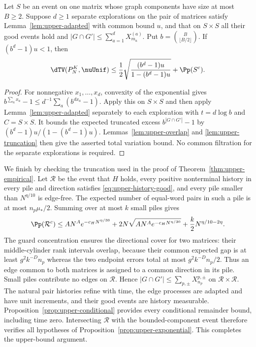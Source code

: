 \begin{proposition}\label{prop:upper-exponential}
Let $S$ be an event on one matrix whose graph components have size
at most $B\ge2$. Suppose $d\ge1$ separate explorations on the pair
of matrices satisfy Lemma~\ref{lem:upper-adapted} with common bound
$u$, and that on $S\times S$ all their good events hold and
$|G\cap G'|\le\sum_{a=1}^d X_{m_a}^{(a)}$.
Put $b=\binom B{\lfloor B/2\rfloor}$. If $(b^d-1)u<1$, then
\[
 \dTV(P_N^K,\nuUnif)
 \le\frac12\sqrt{\frac{(b^d-1)u}{1-(b^d-1)u}}+\Pp(S^c).
\]
\end{proposition}
\begin{proof}
For nonnegative $x_1,\ldots,x_d$, convexity of the exponential gives
$b^{\sum_a x_a}-1\le d^{-1}\sum_a(b^{d x_a}-1)$.
Apply this on $S\times S$ and then apply
Lemma~\ref{lem:upper-adapted} separately to each exploration with
$t=d\log b$ and $C=S\times S$. It bounds the expected truncated
excess $b^{|G\cap G'|}-1$ by $(b^d-1)u/(1-(b^d-1)u)$.
Lemmas~\ref{lem:upper-overlap} and \ref{lem:upper-truncation}
then give the asserted total variation bound. No common filtration
for the separate explorations is required.
\end{proof}

We finish by checking the truncation used in the proof of
Theorem~\ref{thm:upper-empirical}. Let $\mathcal R$ be the event
that $H$ holds, every positive nonterminal history in every pile
and direction satisfies \eqref{eq:upper-history-good}, and every
pile smaller than $N^{\eta/10}$ is edge-free. The expected number
of equal-word pairs in such a pile is at most
$n_p\mu_*/2$. Summing over at most $k$ small piles gives
\[
 \Pp(\mathcal R^c)\le AN^A e^{-c_HN^{\eta/30}}
      +2N\sqrt{AN^A e^{-c_HN^{\eta/30}}}
      +\frac{k}{2}N^{\eta/10-2\eta}.
\]
The guard concentration ensures the directional cover for two
matrices: their middle-cylinder rank intervals overlap, because
their common expected gap is at least $g^2k^{-D}n_p$ whereas the
two endpoint errors total at most $g^2k^{-D}n_p/2$.
Thus an edge common to both matrices is assigned to a common
direction in its pile. Small piles contribute no edges on
$\mathcal R$. Hence
$|G\cap G'|\le\sum_{p,\pm}X_{n_p}^{p,\pm}$ on
$\mathcal R\times\mathcal R$.
The natural pair histories refine with time, the edge processes
are adapted and have unit increments, and their good events are
history measurable. Proposition~\ref{prop:upper-conditional}
provides every conditional remainder bound, including time zero.
Intersecting $\mathcal R$ with the bounded-component event therefore
verifies all hypotheses of Proposition~\ref{prop:upper-exponential}.
This completes the upper-bound argument.

